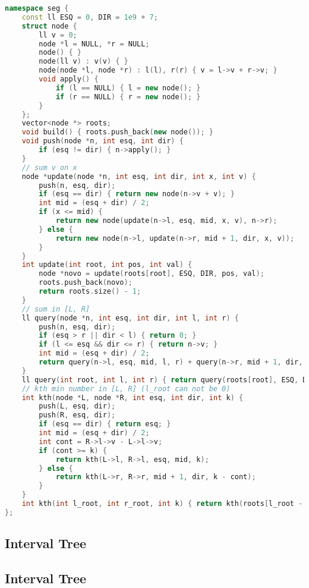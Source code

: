 \documentclass[11pt, a4paper, twoside]{article}
\begin{document}
\begin{lstlisting}[language=C++]
namespace seg {
    const ll ESQ = 0, DIR = 1e9 + 7;
    struct node {
        ll v = 0;
        node *l = NULL, *r = NULL;
        node() { }
        node(ll v) : v(v) { }
        node(node *l, node *r) : l(l), r(r) { v = l->v + r->v; }
        void apply() {
            if (l == NULL) { l = new node(); }
            if (r == NULL) { r = new node(); }
        }
    };
    vector<node *> roots;
    void build() { roots.push_back(new node()); }
    void push(node *n, int esq, int dir) {
        if (esq != dir) { n->apply(); }
    }
    // sum v on x
    node *update(node *n, int esq, int dir, int x, int v) {
        push(n, esq, dir);
        if (esq == dir) { return new node(n->v + v); }
        int mid = (esq + dir) / 2;
        if (x <= mid) {
            return new node(update(n->l, esq, mid, x, v), n->r);
        } else {
            return new node(n->l, update(n->r, mid + 1, dir, x, v));
        }
    }
    int update(int root, int pos, int val) {
        node *novo = update(roots[root], ESQ, DIR, pos, val);
        roots.push_back(novo);
        return roots.size() - 1;
    }
    // sum in [L, R]
    ll query(node *n, int esq, int dir, int l, int r) {
        push(n, esq, dir);
        if (esq > r || dir < l) { return 0; }
        if (l <= esq && dir <= r) { return n->v; }
        int mid = (esq + dir) / 2;
        return query(n->l, esq, mid, l, r) + query(n->r, mid + 1, dir, l, r);
    }
    ll query(int root, int l, int r) { return query(roots[root], ESQ, DIR, l, r); }
    // kth min number in [L, R] (l_root can not be 0)
    int kth(node *L, node *R, int esq, int dir, int k) {
        push(L, esq, dir);
        push(R, esq, dir);
        if (esq == dir) { return esq; }
        int mid = (esq + dir) / 2;
        int cont = R->l->v - L->l->v;
        if (cont >= k) {
            return kth(L->l, R->l, esq, mid, k);
        } else {
            return kth(L->r, R->r, mid + 1, dir, k - cont);
        }
    }
    int kth(int l_root, int r_root, int k) { return kth(roots[l_root - 1], roots[r_root], ESQ, DIR, k); }
};
\end{lstlisting}

\subsection{Interval Tree}


\subsection{Interval Tree}
\end{document}
